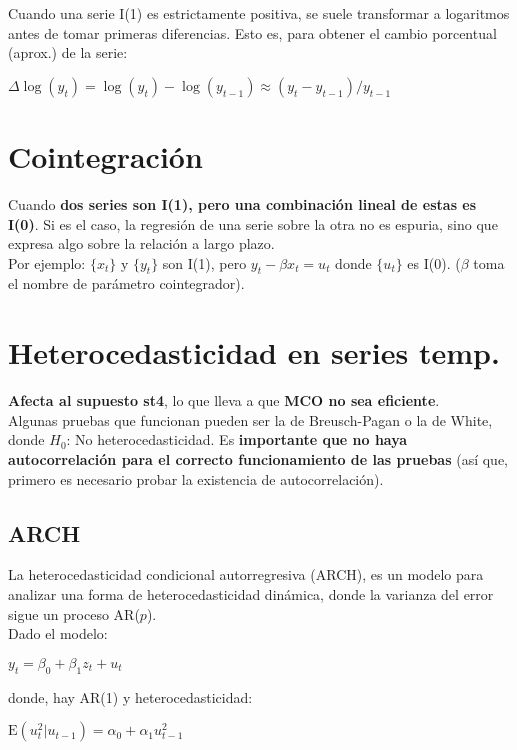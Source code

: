 \documentclass[10pt, a4paper, landscape]{extarticle}
\newcommand{\E}{\mathrm{E}}
\begin{document}
\begin{multicols}{3}
\begin{multicols}{2}
		\end{multicols}
		Cuando una serie I(1) es estrictamente positiva, se suele transformar a logaritmos antes de tomar primeras diferencias. Esto es, para obtener el cambio porcentual (aprox.) de la serie:
		\begin{center}
			$\Delta \log(y_t) = \log(y_t) - \log(y_{t-1}) \approx (y_t - y_{t-1}) / y_{t-1}$
		\end{center}
\columnbreak
\section*{Cointegración}
	Cuando \textbf{dos series son I(1), pero una combinación lineal de estas es I(0)}. Si es el caso, la regresión de una serie sobre la otra no es espuria, sino que expresa algo sobre la relación a largo plazo. \\
	Por ejemplo: $\lbrace x_t \rbrace$ y $\lbrace y_t \rbrace$ son I(1), pero $y_t - \beta x_t = u_t$ donde $\lbrace u_t \rbrace$ es I(0). ($\beta$ toma el nombre de parámetro cointegrador).

\section*{Heterocedasticidad en series temp.}
	\textbf{Afecta al supuesto st4}, lo que lleva a que \textbf{MCO no sea eficiente}. \\
	Algunas pruebas que funcionan pueden ser la de Breusch-Pagan o la de White, donde $H_0$: No heterocedasticidad. Es \textbf{importante que no haya autocorrelación para el correcto funcionamiento de las pruebas} (así que, primero es necesario probar la existencia de autocorrelación).
	\subsection*{ARCH}
		La heterocedasticidad condicional autorregresiva (ARCH), es un modelo para analizar una forma de heterocedasticidad dinámica, donde la varianza del error sigue un proceso AR($p$). \\
		Dado el modelo:
		\begin{center}
			$y_t = \beta_0 + \beta_1 z_t + u_t$
		\end{center}
		donde, hay AR(1) y heterocedasticidad:
		\begin{center}
			$\E(u^2_t | u_{t-1}) = \alpha_0 + \alpha_1 u^2_{t-1}$
		\end{center}

\end{multicols}
\end{document}
